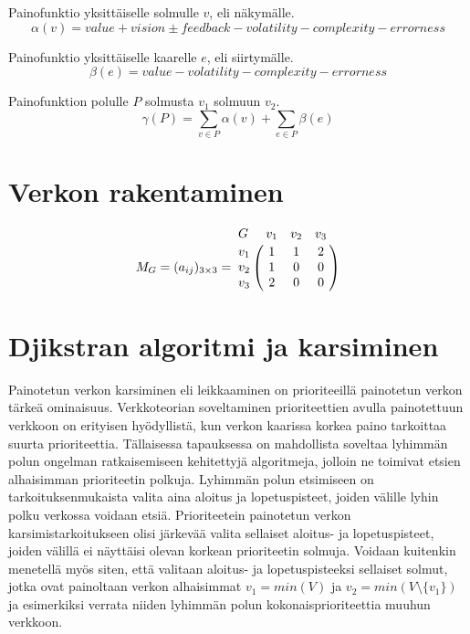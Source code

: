   Painofunktio yksittäiselle solmulle \(v\), eli näkymälle.
  \[\alpha(v) = value + vision \pm feedback - volatility - complexity - errorness\]

  Painofunktio yksittäiselle kaarelle \(e\), eli siirtymälle.
  \[\beta(e) = value - volatility - complexity - errorness\]

  Painofunktion polulle \(P\) solmusta \(v_1\) solmuun \(v_2\).
  \[\gamma(P) = \sum_{v \in P} \alpha(v) + \sum_{e \in P} \beta(e)\]

  \section{Verkon rakentaminen} \label{ch:10_verkon_rakentaminen}

  \[
    M_G = (a_{ij})_{3\times3} =
    \bordermatrix{
      G & v_1 & v_2 & v_3 \cr
      v_1 & 1 & 1 & 2 \cr
      v_2 & 1 & 0 & 0 \cr
      v_3 & 2 & 0 & 0 \cr
    }
  \]

\section{Djikstran algoritmi ja karsiminen} \label{ch:10_djikstran_algoritmi_ja_karsiminen}

  Painotetun verkon karsiminen eli leikkaaminen on prioriteeillä painotetun verkon tärkeä ominaisuus.
  Verkkoteorian soveltaminen prioriteettien avulla painotettuun verkkoon on erityisen hyödyllistä, kun verkon kaarissa korkea paino tarkoittaa suurta prioriteettia.
  Tällaisessa tapauksessa on mahdollista soveltaa lyhimmän polun ongelman ratkaisemiseen kehitettyjä algoritmeja, jolloin ne toimivat etsien alhaisimman prioriteetin polkuja.
  Lyhimmän polun etsimiseen on tarkoituksenmukaista valita aina aloitus ja lopetuspisteet, joiden välille lyhin polku verkossa voidaan etsiä.
  Prioriteetein painotetun verkon karsimistarkoitukseen olisi järkevää valita sellaiset aloitus- ja lopetuspisteet, joiden välillä ei näyttäisi olevan korkean prioriteetin solmuja.
  Voidaan kuitenkin menetellä myös siten, että valitaan aloitus- ja lopetuspisteeksi sellaiset solmut, jotka ovat painoltaan verkon alhaisimmat \(v_1 = min(V)\) ja \(v_2 = min(V \setminus \{v_1\})\) ja esimerkiksi verrata niiden lyhimmän polun kokonaisprioriteettia muuhun verkkoon.

